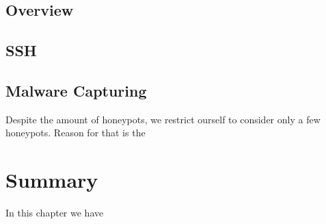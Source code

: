 
\subsection{Overview}

\subsection{SSH}

\subsection{Malware Capturing}




Despite the amount of honeypots, we restrict ourself to consider only a few honeypots.
Reason for that is the 

\section{Summary}

In this chapter we have